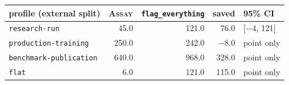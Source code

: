 \begin{tabular}{@{}lrrrl@{}}
\toprule
profile (external split) & \textsc{Assay} & \texttt{flag\_everything} & saved & 95\% CI \\
\midrule
\texttt{research-run} & 45.0 & 121.0 & 76.0 & [$-$4, 121] \\
\texttt{production-training} & 250.0 & 242.0 & $-$8.0 & point only \\
\texttt{benchmark-publication} & 640.0 & 968.0 & 328.0 & point only \\
\texttt{flat} & 6.0 & 121.0 & 115.0 & point only \\
\bottomrule
\end{tabular}
